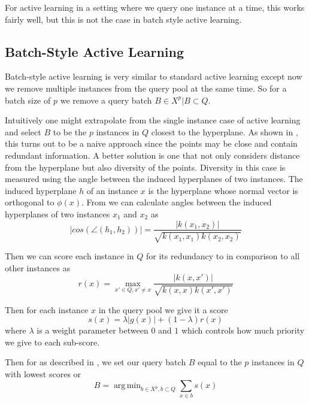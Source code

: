 \documentclass{article}
\DeclareMathOperator*{\argmin}{arg\,min}
\begin{document}
For active learning in a setting where we query one instance at a time, this works fairly well, but this is not the case in batch style active learning. 

\subsection*{Batch-Style Active Learning}

Batch-style active learning is very similar to standard active learning except now we remove multiple instances from the query pool at the same time. So for a batch size of $p$ we remove a query batch
$B \in X^p | B \subset Q$.


Intuitively one might extrapolate from the single instance case of active learning and select $B$ to be the $p$ instances in $Q$ closest to the hyperplane. As shown in \cite{active_learning}, this turns out to be a naive approach since the points may be close and contain redundant information. A better solution is one that not only considers distance from the hyperplane but also diversity of the points. Diversity in this case is measured using the angle between the induced hyperplanes of two instances. The induced hyperplane $h$ of an instance $x$ is the hyperplane whose normal vector is orthogonal to $\phi(x)$. From \cite{active_learning} we can calculate angles between the induced hyperplanes of two instances $x_1$ and $x_2$ as
\[
|cos(\angle(h_1, h_2))| = \frac{|k(x_1,x_2)|}{\sqrt{k(x_1,x_1)k(x_2, x_2)}}
\]

Then we can score each instance in $Q$ for its redundancy to in comparison to all other instances as
\[
r(x) = \max_{x' \in Q, x' \neq x} \frac{|k(x,x')|}{\sqrt{k(x,x)k(x', x')}}
\]

Then for each instance $x$ in the query pool we give it a score
\[
s(x) = \lambda |g(x)| + (1- \lambda) r(x)
\]
where $\lambda$ is a weight parameter between $0$ and $1$ which controls how much priority we give to each sub-score. 

Then for as described in \cite{active_learning}, we set our query batch $B$ equal to the $p$ instances in $Q$ with lowest scores or
\[
B = \argmin_{b \in X^p, b \subset Q} \sum_{x \in b} s(x)
\]
\end{document}
